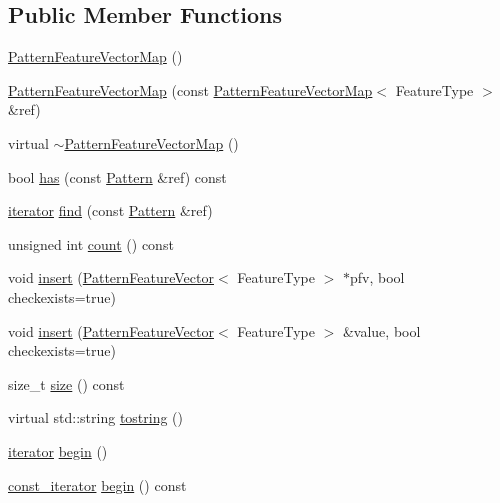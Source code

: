 \subsection*{Public Member Functions}
\begin{DoxyCompactItemize}
\item 
\hyperlink{classPatternFeatureVectorMap_a0381ca488621083a7fafc3e63eedfcae}{Pattern\+Feature\+Vector\+Map} ()
\item 
\hyperlink{classPatternFeatureVectorMap_aab61ba487b202bc5c0be4a68c3924628}{Pattern\+Feature\+Vector\+Map} (const \hyperlink{classPatternFeatureVectorMap}{Pattern\+Feature\+Vector\+Map}$<$ Feature\+Type $>$ \&ref)
\item 
virtual \hyperlink{classPatternFeatureVectorMap_ab4b85487d672c47ed1102ddc485b01d3}{$\sim$\+Pattern\+Feature\+Vector\+Map} ()
\item 
bool \hyperlink{classPatternFeatureVectorMap_ad85a2e354504ffdc477d1d38de98c4ae}{has} (const \hyperlink{classPattern}{Pattern} \&ref) const 
\item 
\hyperlink{classPatternFeatureVectorMap_a1c80bb683efdee17443a5b951412ddd3}{iterator} \hyperlink{classPatternFeatureVectorMap_a7ae30986f3e207afc18cdc918960ad81}{find} (const \hyperlink{classPattern}{Pattern} \&ref)
\item 
unsigned int \hyperlink{classPatternFeatureVectorMap_aafd5e6211bd53aebb5f3810b17d60b32}{count} () const 
\item 
void \hyperlink{classPatternFeatureVectorMap_a90b60dbc7335c97312816da56c7faa56}{insert} (\hyperlink{classPatternFeatureVector}{Pattern\+Feature\+Vector}$<$ Feature\+Type $>$ $\ast$pfv, bool checkexists=true)
\item 
void \hyperlink{classPatternFeatureVectorMap_a0c8495e15a6979ea51f272d908b7c82a}{insert} (\hyperlink{classPatternFeatureVector}{Pattern\+Feature\+Vector}$<$ Feature\+Type $>$ \&value, bool checkexists=true)
\item 
size\+\_\+t \hyperlink{classPatternFeatureVectorMap_a886aeabb1db572b24b156288af3e9779}{size} () const 
\item 
virtual std\+::string \hyperlink{classPatternFeatureVectorMap_a5577a2d1f129119754a8afed91bf60bb}{tostring} ()
\item 
\hyperlink{classPatternFeatureVectorMap_a1c80bb683efdee17443a5b951412ddd3}{iterator} \hyperlink{classPatternFeatureVectorMap_afc5fa83a43764f47a1dc817fd4c2f9a4}{begin} ()
\item 
\hyperlink{classPatternFeatureVectorMap_ae7d2f49b99e49834acbc799a0660cb18}{const\+\_\+iterator} \hyperlink{classPatternFeatureVectorMap_a316e2846d97d33f2d1d3e0dd6b80504d}{begin} () const 

\end{DoxyCompactItemize}

